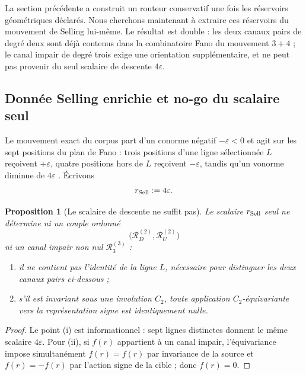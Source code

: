 \documentclass[11pt,a4paper]{article}
\newtheorem{proposition}[theorem]{Proposition}
\begin{document}
La section précédente a construit un routeur conservatif une fois les réservoirs géométriques déclarés. Nous cherchons maintenant à extraire ces réservoirs du mouvement de Selling lui-même. Le résultat est double : les deux canaux pairs de degré deux sont déjà contenus dans la combinatoire Fano du mouvement $3+4$ ; le canal impair de degré trois exige une orientation supplémentaire, et ne peut pas provenir du seul scalaire de descente $4\varepsilon$.

\subsection{Donnée Selling enrichie et no-go du scalaire seul}

Le mouvement exact du corpus part d'un conorme négatif $-\varepsilon<0$ et agit sur les sept positions du plan de Fano : trois positions d'une ligne sélectionnée $L$ reçoivent $+\varepsilon$, quatre positions hors de $L$ reçoivent $-\varepsilon$, tandis qu'un vonorme diminue de $4\varepsilon$ \cite{Selling43}. Écrivons
\begin{equation}\label{eq:v12-selling-scalar}
 r_{\rm Sell}:=4\varepsilon.
\end{equation}

\begin{proposition}[Le scalaire de descente ne suffit pas]\label{prop:v12-scalar-nogo}
Le scalaire $r_{\rm Sell}$ seul ne détermine ni un couple ordonné
\[
 \bigl(\mathscr R_D^{(2)},\mathscr R_U^{(2)}\bigr)
\]
ni un canal impair non nul $\mathscr R_3^{(3)}$ :
\begin{enumerate}[label=\textup{(\roman*)}]
\item il ne contient pas l'identité de la ligne $L$, nécessaire pour distinguer les deux canaux pairs ci-dessous ;
\item s'il est invariant sous une involution $C_2$, toute application $C_2$-équivariante vers la représentation signe est identiquement nulle.
\end{enumerate}
\end{proposition}

\begin{proof}
Le point (i) est informationnel : sept lignes distinctes donnent le même scalaire $4\varepsilon$. Pour (ii), si $f(r)$ appartient à un canal impair, l'équivariance impose simultanément
$f(r)=f(r)$ par invariance de la source et $f(r)=-f(r)$ par l'action signe de la cible ; donc $f(r)=0$.
\end{proof}
\end{document}
